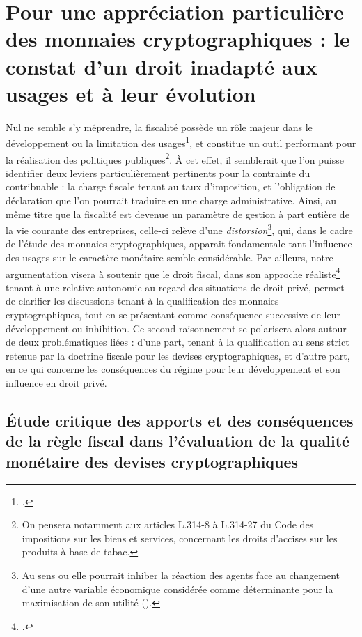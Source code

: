{\section{Pour une appréciation particulière des monnaies cryptographiques : le constat d'un droit inadapté aux usages et à leur évolution}

Nul ne semble s'y méprendre, la fiscalité possède un rôle majeur dans le développement ou la limitation des usages\footnote{.}, et constitue un outil performant pour la réalisation des politiques publiques\footnote{On pensera notamment aux articles L.314-8 à L.314-27 du Code des impositions sur les biens et services, concernant les droits d'accises sur les produits à base de tabac.}. À cet effet, il semblerait que l'on puisse identifier deux leviers particulièrement pertinents pour la contrainte du contribuable : la charge fiscale tenant au taux d'imposition, et l'obligation de déclaration que l'on pourrait traduire en une charge administrative. Ainsi, au même titre que la fiscalité est devenue un paramètre de gestion à part entière de la vie courante des entreprises, celle-ci relève d'une \emph{distorsion}\footnote{Au sens ou elle pourrait inhiber la réaction des agents face au changement d'une autre variable économique considérée comme déterminante pour la maximisation de son utilité ().}, qui, dans le cadre de l'étude des monnaies cryptographiques, apparait fondamentale tant l'influence des usages sur le caractère monétaire semble considérable. Par ailleurs, notre argumentation visera à soutenir que le droit fiscal, dans son approche réaliste\footnote{.} tenant à une relative autonomie au regard des situations de droit privé, permet de clarifier les discussions tenant à la qualification des monnaies cryptographiques, tout en se présentant comme conséquence successive de leur développement ou inhibition. Ce second raisonnement se polarisera alors autour de deux problématiques liées : d'une part, tenant à la qualification au sens strict retenue par la doctrine fiscale pour les devises cryptographiques, et d'autre part, en ce qui concerne les conséquences du régime pour leur développement et son influence en droit privé.

\subsection{Étude critique des apports et des conséquences de la règle fiscal dans l'évaluation de la qualité monétaire des devises cryptographiques}

}
